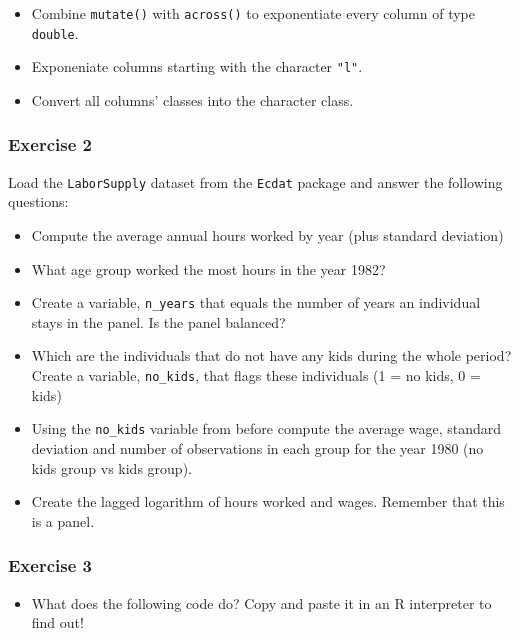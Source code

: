 \documentclass[
]{article}
\providecommand{\tightlist}{%
  \setlength{\itemsep}{0pt}\setlength{\parskip}{0pt}}
\begin{document}
\begin{itemize}
\item
  Combine \texttt{mutate()} with \texttt{across()} to exponentiate every column of type \texttt{double}.
\item
  Exponeniate columns starting with the character \texttt{"l"}.
\item
  Convert all columns' classes into the character class.
\end{itemize}

\hypertarget{exercise-2-1}{%
\subsubsection*{Exercise 2}\label{exercise-2-1}}

Load the \texttt{LaborSupply} dataset from the \texttt{Ecdat} package and answer the following questions:

\begin{itemize}
\tightlist
\item
  Compute the average annual hours worked by year (plus standard deviation)
\item
  What age group worked the most hours in the year 1982?
\item
  Create a variable, \texttt{n\_years} that equals the number of years an individual stays in the panel. Is the panel balanced?
\item
  Which are the individuals that do not have any kids during the whole period? Create a variable, \texttt{no\_kids}, that flags these individuals (1 = no kids, 0 = kids)
\item
  Using the \texttt{no\_kids} variable from before compute the average wage, standard deviation and number of observations in each group for the year 1980 (no kids group vs kids group).
\item
  Create the lagged logarithm of hours worked and wages. Remember that this is a panel.
\end{itemize}

\hypertarget{exercise-3-1}{%
\subsubsection*{Exercise 3}\label{exercise-3-1}}

\begin{itemize}
\tightlist
\item
  What does the following code do? Copy and paste it in an R interpreter to find out!
\end{itemize}
\end{document}
